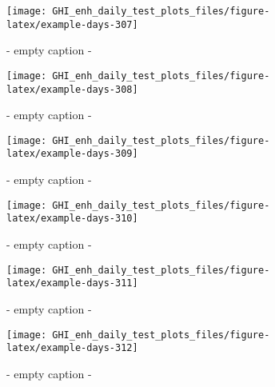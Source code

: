 \documentclass[
  10pt,
  a4paper,oneside]{article}
\begin{document}
\begin{figure}[H]

{\centering \texttt{[image: GHI\_enh\_daily\_test\_plots\_files/figure-latex/example-days-307]} 

}

\caption{ - empty caption - }\label{fig:example-days-307}
\end{figure}

\begin{figure}[H]

{\centering \texttt{[image: GHI\_enh\_daily\_test\_plots\_files/figure-latex/example-days-308]} 

}

\caption{ - empty caption - }\label{fig:example-days-308}
\end{figure}

\begin{figure}[H]

{\centering \texttt{[image: GHI\_enh\_daily\_test\_plots\_files/figure-latex/example-days-309]} 

}

\caption{ - empty caption - }\label{fig:example-days-309}
\end{figure}

\begin{figure}[H]

{\centering \texttt{[image: GHI\_enh\_daily\_test\_plots\_files/figure-latex/example-days-310]} 

}

\caption{ - empty caption - }\label{fig:example-days-310}
\end{figure}

\begin{figure}[H]

{\centering \texttt{[image: GHI\_enh\_daily\_test\_plots\_files/figure-latex/example-days-311]} 

}

\caption{ - empty caption - }\label{fig:example-days-311}
\end{figure}

\begin{figure}[H]

{\centering \texttt{[image: GHI\_enh\_daily\_test\_plots\_files/figure-latex/example-days-312]} 

}

\caption{ - empty caption - }\label{fig:example-days-312}
\end{figure}
\end{document}
